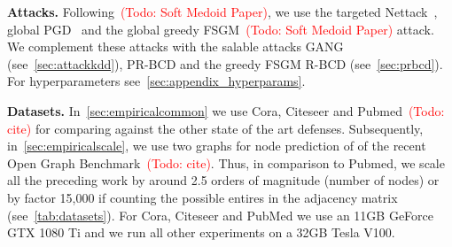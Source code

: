 \documentclass{article} %
\newcommand{\todo}[1]{\textcolor{red}{(Todo: #1)}}
\begin{document}
\textbf{Attacks.} Following~\todo{Soft Medoid Paper}, we use the targeted Nettack~\citep{Zugner2018}, global PGD~\citep{Xu2019a} and the global greedy FSGM~\todo{Soft Medoid Paper} attack. We complement these attacks with the salable attacks GANG (see~\autoref{sec:attackkdd}), PR-BCD and the greedy FSGM R-BCD (see~\autoref{sec:prbcd}). For hyperparameters see~\autoref{sec:appendix_hyperparams}.

\textbf{Datasets.} In~\autoref{sec:empiricalcommon} we use Cora, Citeseer and Pubmed~\todo{cite} for comparing against the other state of the art defenses. Subsequently, in~\autoref{sec:empiricalscale}, we use two graphs for node prediction of of the recent Open Graph Benchmark~\todo{cite}. Thus, in comparison to Pubmed, we scale all the preceding work by around 2.5 orders of magnitude (number of nodes) or by factor 15,000 if counting the possible entires in the adjacency matrix (see~\autoref{tab:datasets}). For Cora, Citeseer and PubMed we use an 11GB GeForce GTX 1080 Ti and we run all other experiments on a 32GB Tesla V100.
\end{document}
